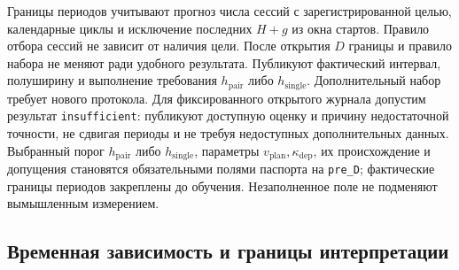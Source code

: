 \documentclass[12pt,a4paper]{article}
\newcommand{\code}[1]{{\ttfamily\small\nolinkurl{#1}}}
\theoremstyle{plainru}
\begin{document}
Границы периодов учитывают прогноз числа сессий с зарегистрированной целью,
календарные циклы и исключение последних $H+g$ из окна стартов.
Правило отбора сессий не зависит от наличия цели. После открытия $D$
границы и правило набора не меняют ради удобного результата.
Публикуют фактический интервал, полуширину и выполнение требования
$h_{\mathrm{pair}}$ либо $h_{\mathrm{single}}$.
Дополнительный набор требует нового протокола.
Для фиксированного открытого журнала допустим результат
\texttt{insufficient}: публикуют доступную оценку и причину недостаточной
точности, не сдвигая периоды и не требуя недоступных дополнительных данных.
Выбранный порог $h_{\mathrm{pair}}$ либо $h_{\mathrm{single}}$,
параметры $v_{\mathrm{plan}},\kappa_{\mathrm{dep}}$,
их происхождение и допущения становятся обязательными полями паспорта
на \code{pre_D}; фактические границы периодов закреплены до обучения.
Незаполненное поле не подменяют вымышленным измерением.

\subsection{Временная зависимость и границы интерпретации}
\label{sec:eval-time-block}
\end{document}
